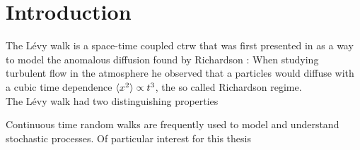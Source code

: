 \chapter{Introduction}

The L\'evy walk is a space-time coupled \gls{ctrw} that was first presented in \cite{shlesinger1987} as a way to model the anomalous diffusion found by Richardson \cite{richardson}: When studying turbulent flow in the atmosphere he observed that a particles  would diffuse with a cubic time dependence $\langle x^2 \rangle \propto t^3$, the so called Richardson regime.\\

The L\'evy walk had two distinguishing properties 

Continuous time random walks are frequently used to model and understand stochastic processes. Of particular interest for this thesis 








